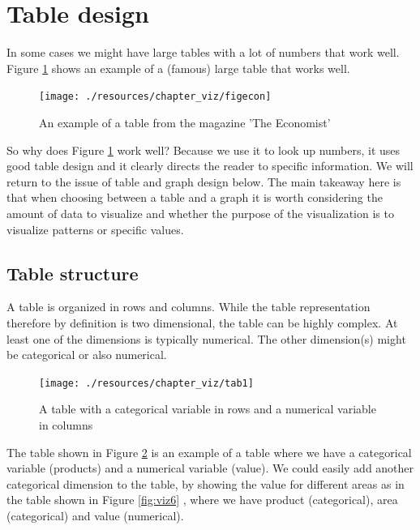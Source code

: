 \documentclass[
]{book}
\begin{document}
\hypertarget{table-design}{%
\section{Table design}\label{table-design}}

In some cases we might have large tables with a lot of numbers that work well. Figure \ref{fig:viz4} shows an example of a (famous) large table that works well.

\begin{figure}

{\centering \texttt{[image: ./resources/chapter\_viz/figecon]} 

}

\caption{An example of a table from the magazine 'The Economist'}\label{fig:viz4}
\end{figure}

So why does Figure \ref{fig:viz4} work well? Because we use it to look up numbers, it uses good table design and it clearly directs the reader to specific information.
We will return to the issue of table and graph design below. The main takeaway here is that when choosing between a table and a graph it is worth considering the amount of data to visualize and whether the purpose of the visualization is to visualize patterns or specific values.

\hypertarget{table-structure}{%
\subsection*{Table structure}\label{table-structure}}

A table is organized in rows and columns. While the table representation therefore by definition is two dimensional, the table can be highly complex. At least one of the dimensions is typically numerical. The other dimension(s) might be categorical or also numerical.

\begin{figure}

{\centering \texttt{[image: ./resources/chapter\_viz/tab1]} 

}

\caption{A table with a categorical variable in rows and a numerical variable in columns}\label{fig:viz5}
\end{figure}

The table shown in Figure \ref{fig:viz5} is an example of a table where we have a categorical variable (products) and a numerical variable (value). We could easily add another categorical dimension to the table, by showing the value for different areas as in the table shown in Figure \ref{fig:viz6} , where we have product (categorical), area (categorical) and value (numerical).
\end{document}
